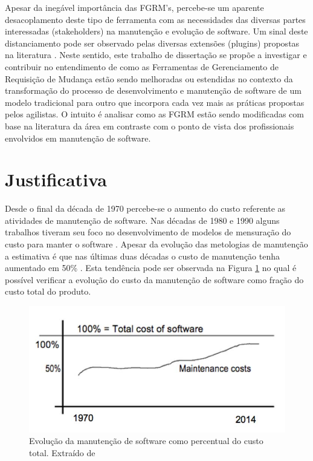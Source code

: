 \documentclass[msc]{ppgccufmg} %
\begin{document}
Apesar da inegável importância das FGRM's, percebe-se um aparente desacoplamento deste tipo de ferramenta com as necessidades das diversas partes interessadas (stakeholders) na manutenção e evolução de software. Um sinal deste distanciamento pode ser observado pelas diversas extensões (plugins) propostas na literatura \cite{101186,Thung:2014:BIT:2635868.2661678,Kononenko:2014:DED:2591062.2591075}. Neste sentido, este trabalho de dissertação se propõe a investigar e contribuir no entendimento de como as Ferramentas de Gerenciamento de Requisição de Mudança estão sendo melhoradas ou estendidas no contexto da transformação do processo de desenvolvimento e manutenção de software de um modelo tradicional para outro que incorpora cada vez mais as práticas propostas pelos agilistas. O intuito é analisar como as FGRM estão sendo modificadas com base na literatura da área em contraste com o ponto de vista dos profissionais envolvidos em manutenção de software.
 
\section{Justificativa}
\label{sec:intro-justificativa}
Desde o final da década de 1970 \cite{Zelkowitz:1979:PSE:578504} percebe-se o aumento do custo referente as atividades de  manutenção de software. Nas décadas de 1980 e 1990 alguns
trabalhos tiveram seu foco no desenvolvimento de modelos de mensuração do custo
para manter o software \cite{Herrin:1985:SMC:323287.323383,hirota1994approach}. Apesar da evolução das metologias de manutenção a estimativa é que nas últimas duas décadas o custo de manutenção tenha aumentado em 50\% \cite{koskinen2010software}. Esta tendência pode ser observada na Figura \ref{fig:software-maintence-costs} no qual é possível verificar a evolução do custo da manutenção de software como fração do custo total do produto.

\begin{figure}
\centering
\includegraphics[width=0.7\linewidth]{../img/software-maintence-costs}
\caption{Evolução da manutenção de software como percentual do custo total.	Extraído de	\cite{engelbertink2010save}}

\label{fig:software-maintence-costs}
\end{figure}
\end{document}
